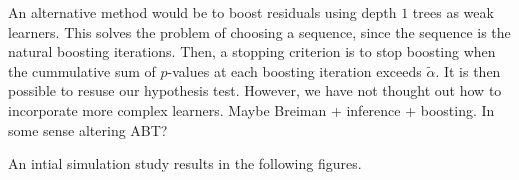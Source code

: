 \documentclass{article}
\theoremstyle{definition}
\theoremstyle{remark}
\begin{document}
An alternative method would be to boost residuals using depth $ 1 $ trees as
weak learners. This solves the problem of choosing a sequence, since the
sequence is the natural boosting iterations. Then, a stopping criterion is 
to stop boosting when the cummulative sum of $ p $-values at each boosting
iteration exceeds $ \tilde\alpha $. It is then possible to resuse our hypothesis
test. However, we have not thought out how to incorporate more complex learners.
Maybe Breiman + inference + boosting. In some sense altering ABT?

An intial simulation study results in the following figures.


\begin{figure}

\end{figure}
\end{document}

